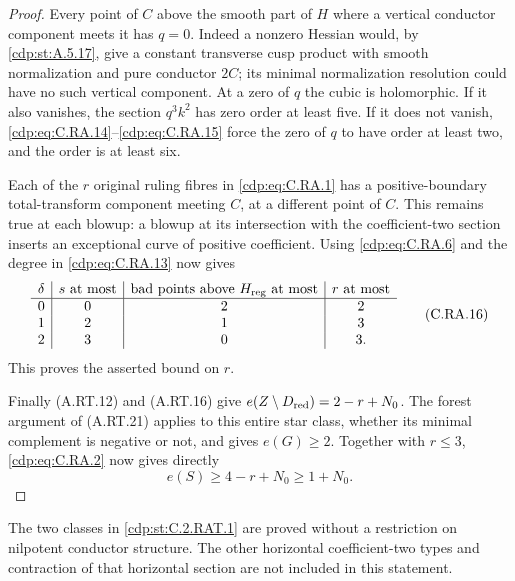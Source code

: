 \begin{proof}
Every point of $C$ above the smooth part of $H$ where a
vertical conductor component meets it has $q=0$.
Indeed a nonzero Hessian would, by \ref{cdp:st:A.5.17}, give a constant
transverse cusp product with smooth normalization and pure
conductor $2C$; its minimal normalization resolution could
have no such vertical component. At a zero of $q$ the
cubic is holomorphic. If it also vanishes, the section
$q^3k^2$ has zero order at least five. If it does not
vanish, \eqref{cdp:eq:C.RA.14}--\eqref{cdp:eq:C.RA.15} force the zero of $q$ to
have order at least two, and the order is at least six.

Each of the $r$ original ruling fibres in \eqref{cdp:eq:C.RA.1} has
a positive-boundary total-transform component meeting $C$,
at a different point of $C$. This remains true at each
blowup: a blowup at its intersection with the coefficient-two
section inserts an exceptional curve of positive coefficient.
Using \eqref{cdp:eq:C.RA.6} and the degree in \eqref{cdp:eq:C.RA.13} now gives
\[
 \begin{array}{c|c|c|c}
 \delta& s\text{ at most}&
 \text{bad points above }H_{\rm reg}\text{ at most}&r\text{ at most}\\ \hline
 0&0&2&2\\
 1&2&1&3\\
 2&3&0&3 .
 \end{array}                                    \tag{C.RA.16}\label{cdp:eq:C.RA.16}
\]
This proves the asserted bound on $r$.

Finally (A.RT.12) and (A.RT.16) give
$e(Z\setminus D_{\rm red})=2-r+N_0$.
The forest argument of (A.RT.21) applies to this entire
star class, whether its minimal complement is negative
or not, and gives $e(G)\ge2$.
Together with $r\le3$, \eqref{cdp:eq:C.RA.2} now gives directly
\[
                 e(S)\ge4-r+N_0\ge1+N_0.
 \tag{C.RA.17}\label{cdp:eq:C.RA.17}
\]
\end{proof}

The two classes in \ref{cdp:st:C.2.RAT.1} are proved without a restriction
on nilpotent conductor structure. The other horizontal
coefficient-two types and contraction of that horizontal
section are not included in this statement.


